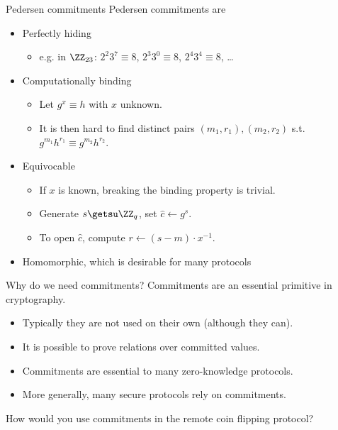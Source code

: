 \begin{frame}{Pedersen commitments}
  Pedersen commitments are
  \begin{itemize}[<+(1)->]
    \item Perfectly hiding
    \begin{itemize}
      \item e.g. in $\ZZ_{23}$: $2^2 3^7 \equiv 8$, $2^3 3^0 \equiv 8$, $2^4 3^4 \equiv 8$, \dots
    \end{itemize}
    \item Computationally binding
    \begin{itemize}
      \item Let $g^x \equiv h$ with $x$ unknown.
      \item It is then hard to find distinct pairs $(m_1, r_1), (m_2, r_2)$ s.t. $g^{m_1} h^{r_1} \equiv g^{m_2} h^{r_2}$. 
    \end{itemize}
    \item Equivocable
    \begin{itemize}
      \item If $x$ is known, breaking the binding property is trivial.
      \item Generate $s \getsu \ZZ_{q}$, set $\hat{c} \gets g^s$.
      \item To open $\hat{c}$, compute $r \gets (s-m)\cdot x^{-1}$.
    \end{itemize}
    \item Homomorphic, which is desirable for many protocols
  \end{itemize}
\end{frame}

\begin{frame}{Why do we need commitments?}
  Commitments are an essential primitive in cryptography.
  \begin{itemize}[<+(1)->]
    \item Typically they are not used on their own (although they can).
    \item It is possible to prove relations over committed values.
    \item Commitments are essential to many zero-knowledge protocols.
    \item More generally, many secure protocols rely on commitments.
  \end{itemize}

  \vspace*{1em}

  \pause
  How would you use commitments in the remote coin flipping protocol?
\end{frame}

